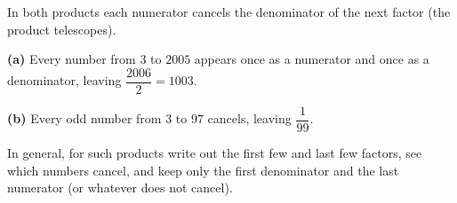 In both products each numerator cancels the denominator of the next factor (the product telescopes).

\textbf{(a)} Every number from $3$ to $2005$ appears once as a numerator and once as a denominator, leaving $\dfrac{2006}{2}=\boxed{1003}$.

\textbf{(b)} Every odd number from $3$ to $97$ cancels, leaving $\boxed{\dfrac{1}{99}}$.

In general, for such products write out the first few and last few factors, see which numbers cancel, and keep only the first denominator and the last numerator (or whatever does not cancel).
